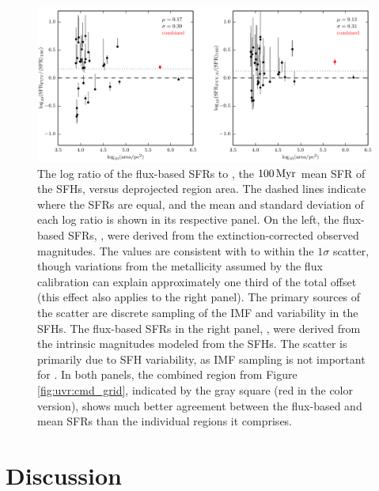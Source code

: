


\begin{figure}
\centering
\includegraphics[width=\textwidth]{uv_regions-figures/sfr.pdf}
\caption[The log ratio of the \fuv{} flux-based SFRs to the $100\myr$ mean SFR of the SFHs
    versus deprojected region area.]{The log ratio of the \fuv{} flux-based SFRs to \sfroneh{},
    the $100\myr$ mean SFR of the SFHs,
    versus deprojected region area. The dashed lines indicate where the SFRs
    are equal, and the mean and standard deviation of each log ratio is shown
    in its respective panel. On the left, the flux-based SFRs,
    \sfrfuv{}, were derived from the extinction-corrected observed
    \fuv{} magnitudes. The \sfrfuv{} values are consistent with
    \sfroneh{} to within the $1\sigma$ scatter, though
    variations from the metallicity assumed by the flux calibration can explain
    approximately one third of the total offset (this effect also applies to
    the right panel). The primary sources of the scatter are discrete sampling
    of the IMF and variability in the SFHs. The flux-based SFRs in the right
    panel, \sfrfuvz{}, were derived from the intrinsic \fuv{}
    magnitudes modeled from the SFHs. The scatter is primarily due to SFH
    variability, as IMF sampling is not important for \sfrfuvz{}.
    In both panels, the combined region from Figure \ref{fig:uvr:cmd_grid},
    indicated by the gray square (red in the color version), shows much better
    agreement between the flux-based and mean SFRs than the individual regions
    it comprises.
}
\label{fig:uvr:sfrs}
\end{figure}





\section{Discussion}\label{uvr:discussion}

